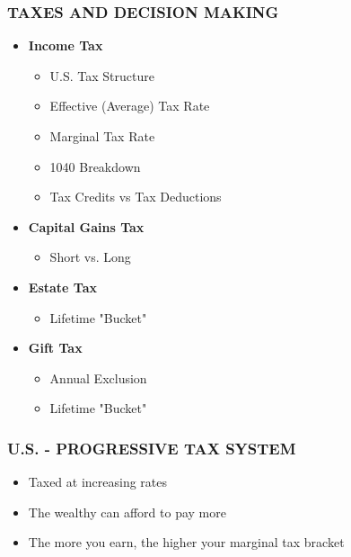 \documentclass[12pt]{article}
\begin{document}
            \subsubsection{TAXES AND DECISION MAKING}
                \begin{itemize}
                    \item \textbf{Income Tax}
                        \begin{itemize}
                            \item U.S. Tax Structure
                            \item Effective (Average) Tax Rate
                            \item Marginal Tax Rate
                            \item 1040 Breakdown
                            \item Tax Credits vs Tax Deductions
                        \end{itemize}
                    \item \textbf{Capital Gains Tax}
                        \begin{itemize}
                            \item Short vs. Long
                        \end{itemize}
                    \item \textbf{Estate Tax}
                        \begin{itemize}
                            \item Lifetime "Bucket"
                        \end{itemize}
                    \item \textbf{Gift Tax}
                        \begin{itemize}
                            \item Annual Exclusion
                            \item Lifetime "Bucket"
                        \end{itemize}
                \end{itemize}
            \subsubsection{U.S. - PROGRESSIVE TAX SYSTEM}
                \begin{itemize}
                    \item Taxed at increasing rates
                    \item The wealthy can afford to pay more
                    \item The more you earn, the higher your marginal tax bracket
                \end{itemize}
\end{document}
